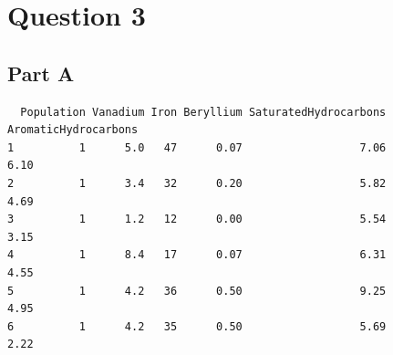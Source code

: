 \documentclass[
  letterpaper,
  DIV=11,
  numbers=noendperiod]{scrartcl}
\newenvironment{Shaded}{}{}
\newcommand{\FunctionTok}[1]{\textcolor[rgb]{0.41,0.62,0.42}{#1}}
\newcommand{\NormalTok}[1]{\textcolor[rgb]{0.24,0.22,0.21}{#1}}
\newcommand{\OtherTok}[1]{\textcolor[rgb]{0.41,0.62,0.42}{#1}}
\newcommand{\SpecialCharTok}[1]{\textcolor[rgb]{0.69,0.38,0.53}{#1}}
\newcommand{\StringTok}[1]{\textcolor[rgb]{0.60,0.59,0.10}{#1}}
\begin{document}
\hypertarget{question-3}{%
\section{Question 3}\label{question-3}}

\hypertarget{part-a-1}{%
\subsection{Part A}\label{part-a-1}}

\begin{Shaded}
\end{Shaded}

\begin{verbatim}
  Population Vanadium Iron Beryllium SaturatedHydrocarbons AromaticHydrocarbons
1          1      5.0   47      0.07                  7.06                 6.10
2          1      3.4   32      0.20                  5.82                 4.69
3          1      1.2   12      0.00                  5.54                 3.15
4          1      8.4   17      0.07                  6.31                 4.55
5          1      4.2   36      0.50                  9.25                 4.95
6          1      4.2   35      0.50                  5.69                 2.22
\end{verbatim}
\end{document}
